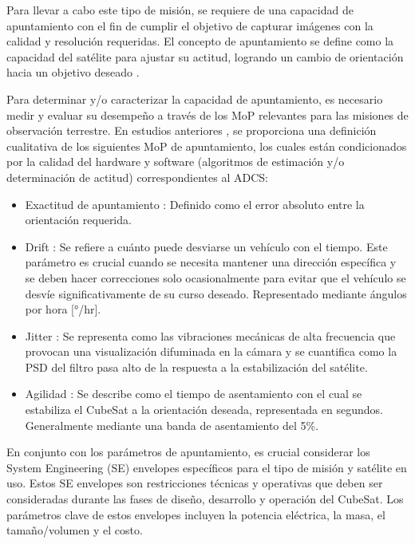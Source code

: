 Para llevar a cabo este tipo de misión, se requiere de una capacidad de apuntamiento con el fin de cumplir el objetivo de capturar imágenes con la calidad y resolución requeridas. El concepto de apuntamiento se define como la capacidad del satélite para ajustar su actitud, logrando un cambio de orientación hacia un objetivo deseado \cite{ref5}. 

Para determinar y/o caracterizar la capacidad de apuntamiento, es necesario medir y evaluar su desempeño a través de los \gls{MoP} relevantes para las misiones de observación terrestre. En estudios anteriores \cite{ref5, ref6, ref7, ref8} , se proporciona una definición cualitativa de los siguientes MoP de apuntamiento, los cuales están condicionados por la calidad del hardware y software (algoritmos de estimación y/o determinación de actitud) correspondientes al \gls{ADCS}:

\begin{itemize}
	\item Exactitud de apuntamiento \cite{ref5,ref7}: Definido como el error absoluto entre la orientación requerida.
	\item Drift \cite{ref5}: Se refiere a cuánto puede desviarse un vehículo con el tiempo. Este parámetro es crucial cuando se necesita mantener una dirección específica y se deben hacer correcciones solo ocasionalmente para evitar que el vehículo se desvíe significativamente de su curso deseado. Representado mediante ángulos por hora [°/hr].
	\item Jitter \cite{ref9,ref10}: Se representa como las vibraciones mecánicas de alta frecuencia que provocan una visualización difuminada en la cámara y se cuantifica como la \gls{PSD} del filtro pasa alto de la respuesta a la estabilización del satélite.
	\item Agilidad \cite{ref11}: Se describe como el tiempo de asentamiento con el cual se estabiliza el CubeSat a la orientación deseada, representada en segundos. Generalmente mediante una banda de asentamiento del 5\%.
\end{itemize}

En conjunto con los parámetros de apuntamiento, es crucial considerar los System Engineering (SE) envelopes específicos para el tipo de misión y satélite en uso. Estos SE envelopes son restricciones técnicas y operativas que deben ser consideradas durante las fases de diseño, desarrollo y operación del CubeSat. Los parámetros clave de estos envelopes incluyen la potencia eléctrica, la masa, el tamaño/volumen y el costo.

